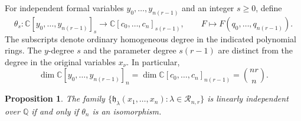 \documentclass[12pt,reqno,a4paper]{amsart}
\numberwithin{equation}{section}
\numberwithin{figure}{section}
\theoremstyle{plain}
\newtheorem{proposition}[theorem]{Proposition}
\theoremstyle{definition}
\begin{document}
For independent formal variables $y_0,\ldots,y_{n(r-1)}$ and an integer
$s\geq0$, define
\begin{equation}\label{eq:homogeneous-substitution}
 \theta_s:\mathbb C[y_0,\ldots,y_{n(r-1)}]_s
       \longrightarrow\mathbb C[c_0,\ldots,c_n]_{s(r-1)},
 \qquad F\longmapsto F(q_0,\ldots,q_{n(r-1)}).
\end{equation}
The subscripts denote ordinary homogeneous degree in the indicated
polynomial rings. The $y$-degree $s$ and the parameter degree $s(r-1)$ are distinct from the degree in the original variables $x_\nu$.  In particular,
\begin{equation}\label{eq:homogeneous-map-dimensions}
 \dim\mathbb C[y_0,\ldots,y_{n(r-1)}]_n
 =\dim\mathbb C[c_0,\ldots,c_n]_{n(r-1)}
 =\binom{nr}{n}.
\end{equation}

\begin{proposition}\label{prop:finite-basis-reduction}
The family $\{\mathfrak h_\lambda(x_1,\ldots,x_n):
\lambda\in\mathcal R_{n,r}\}$ is linearly independent over
$\mathbb Q$ if and only if $\theta_n$ is an isomorphism.
\end{proposition}
\end{document}

